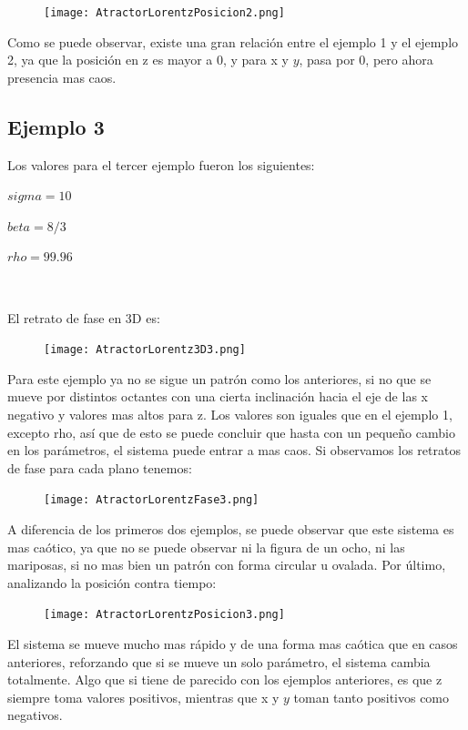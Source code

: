 \documentclass[12pt]{article}
\begin{document}
\begin{figure}[h!]
    \centering
\texttt{[image: AtractorLorentzPosicion2.png]}
\end{figure}

Como se puede observar, existe una gran relación entre el ejemplo 1 y el ejemplo 2, ya que la posición en z es mayor a 0, y para x y $y$, pasa por 0, pero ahora presencia mas caos. 

\subsection{Ejemplo 3}
Los valores para el tercer ejemplo fueron los siguientes: \\

\centerline{$ sigma = 10$}
\centerline{$ beta = 8/3$}
\centerline{$ rho = 99.96$}
$    $

\pagebreak

El retrato de fase en 3D es:

\begin{figure}[h!]
    \centering
\texttt{[image: AtractorLorentz3D3.png]}
\end{figure}

Para este ejemplo ya no se sigue un patrón como los anteriores, si no que se mueve por distintos octantes con una cierta inclinación hacia el eje de las x negativo y valores mas altos para z. Los valores son iguales que en el ejemplo 1, excepto rho, así que de esto se puede concluir que hasta con un pequeño cambio en los parámetros, el sistema puede entrar a mas caos. Si observamos los retratos de fase para cada plano tenemos:

\begin{figure}[h!]
    \centering
\texttt{[image: AtractorLorentzFase3.png]}
\end{figure}

A diferencia de los primeros dos ejemplos, se puede observar que este sistema es mas caótico, ya que no se puede observar ni la figura de un ocho, ni las mariposas, si no mas bien un patrón con forma circular u ovalada. Por último, analizando la posición contra tiempo:

\pagebreak

\begin{figure}[h!]
    \centering
\texttt{[image: AtractorLorentzPosicion3.png]}
\end{figure}

El sistema se mueve mucho mas rápido y de una forma mas caótica que en casos anteriores, reforzando que si se mueve un solo parámetro, el sistema cambia totalmente. Algo que si tiene de parecido con los ejemplos anteriores, es que z siempre toma valores positivos, mientras que x y $y$ toman tanto positivos como negativos.
\end{document}
